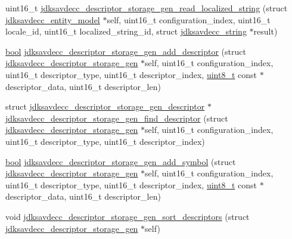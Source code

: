 \begin{DoxyCompactItemize}
\item 
uint16\+\_\+t \hyperlink{group__descriptor__storage__gen_ga0fbc336d873655cfdffa4f33c361a40b}{jdksavdecc\+\_\+descriptor\+\_\+storage\+\_\+gen\+\_\+read\+\_\+localized\+\_\+string} (struct \hyperlink{structjdksavdecc__entity__model}{jdksavdecc\+\_\+entity\+\_\+model} $\ast$self, uint16\+\_\+t configuration\+\_\+index, uint16\+\_\+t locale\+\_\+id, uint16\+\_\+t localized\+\_\+string\+\_\+id, struct \hyperlink{structjdksavdecc__string}{jdksavdecc\+\_\+string} $\ast$result)
\item 
\hyperlink{avb__gptp_8h_af6a258d8f3ee5206d682d799316314b1}{bool} \hyperlink{group__descriptor__storage__gen_gaa533ea95b5ccbb82515f7bc26b086947}{jdksavdecc\+\_\+descriptor\+\_\+storage\+\_\+gen\+\_\+add\+\_\+descriptor} (struct \hyperlink{structjdksavdecc__descriptor__storage__gen}{jdksavdecc\+\_\+descriptor\+\_\+storage\+\_\+gen} $\ast$self, uint16\+\_\+t configuration\+\_\+index, uint16\+\_\+t descriptor\+\_\+type, uint16\+\_\+t descriptor\+\_\+index, \hyperlink{stdint_8h_aba7bc1797add20fe3efdf37ced1182c5}{uint8\+\_\+t} const $\ast$descriptor\+\_\+data, uint16\+\_\+t descriptor\+\_\+len)
\item 
struct \hyperlink{structjdksavdecc__descriptor__storage__gen__descriptor}{jdksavdecc\+\_\+descriptor\+\_\+storage\+\_\+gen\+\_\+descriptor} $\ast$ \hyperlink{group__descriptor__storage__gen_ga7fbc268fa715c3a07b2917b34fdbdc4c}{jdksavdecc\+\_\+descriptor\+\_\+storage\+\_\+gen\+\_\+find\+\_\+descriptor} (struct \hyperlink{structjdksavdecc__descriptor__storage__gen}{jdksavdecc\+\_\+descriptor\+\_\+storage\+\_\+gen} $\ast$self, uint16\+\_\+t configuration\+\_\+index, uint16\+\_\+t descriptor\+\_\+type, uint16\+\_\+t descriptor\+\_\+index)
\item 
\hyperlink{avb__gptp_8h_af6a258d8f3ee5206d682d799316314b1}{bool} \hyperlink{group__descriptor__storage__gen_ga32653d544cfc78947e6297f6931ffed7}{jdksavdecc\+\_\+descriptor\+\_\+storage\+\_\+gen\+\_\+add\+\_\+symbol} (struct \hyperlink{structjdksavdecc__descriptor__storage__gen}{jdksavdecc\+\_\+descriptor\+\_\+storage\+\_\+gen} $\ast$self, uint16\+\_\+t configuration\+\_\+index, uint16\+\_\+t descriptor\+\_\+type, uint16\+\_\+t descriptor\+\_\+index, \hyperlink{stdint_8h_aba7bc1797add20fe3efdf37ced1182c5}{uint8\+\_\+t} const $\ast$descriptor\+\_\+data, uint16\+\_\+t descriptor\+\_\+len)
\item 
void \hyperlink{group__descriptor__storage__gen_ga5dd04366f0259c8ad11c8627da263cbd}{jdksavdecc\+\_\+descriptor\+\_\+storage\+\_\+gen\+\_\+sort\+\_\+descriptors} (struct \hyperlink{structjdksavdecc__descriptor__storage__gen}{jdksavdecc\+\_\+descriptor\+\_\+storage\+\_\+gen} $\ast$self)

\end{DoxyCompactItemize}
